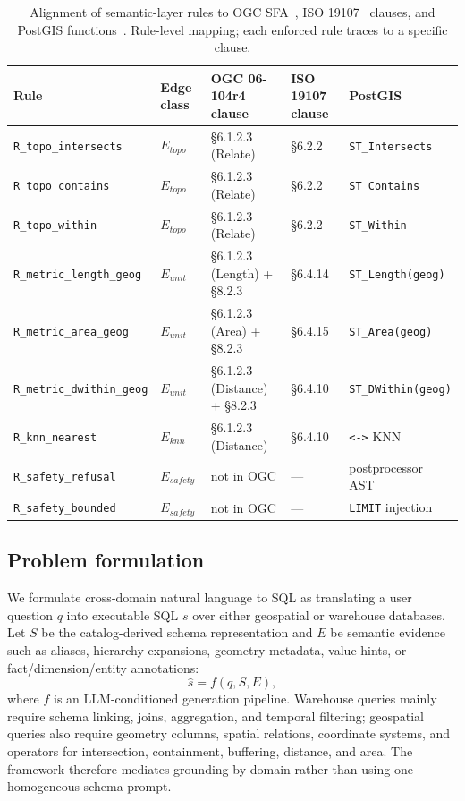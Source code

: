 \begin{table}[t]
\centering\footnotesize
\caption{Alignment of semantic-layer rules to OGC SFA~\citep{ogcsfs}, ISO 19107~\citep{iso19107} clauses, and PostGIS functions~\citep{postgis}. Rule-level mapping; each enforced rule traces to a specific clause.}
\label{tab:alignment}
{\setlength{\tabcolsep}{4pt}
\begin{tabular}{@{}lllll@{}}
\toprule
Rule & Edge class & OGC 06-104r4 clause & ISO 19107 clause & PostGIS \\
\midrule
\texttt{R\_topo\_intersects} & $E_{topo}$ & \S 6.1.2.3 (Relate)   & \S 6.2.2 & \texttt{ST\_Intersects} \\
\texttt{R\_topo\_contains}   & $E_{topo}$ & \S 6.1.2.3 (Relate)   & \S 6.2.2 & \texttt{ST\_Contains} \\
\texttt{R\_topo\_within}     & $E_{topo}$ & \S 6.1.2.3 (Relate)   & \S 6.2.2 & \texttt{ST\_Within} \\
\texttt{R\_metric\_length\_geog}   & $E_{unit}$ & \S 6.1.2.3 (Length) + \S 8.2.3 & \S 6.4.14 & \texttt{ST\_Length(geog)} \\
\texttt{R\_metric\_area\_geog}     & $E_{unit}$ & \S 6.1.2.3 (Area) + \S 8.2.3   & \S 6.4.15 & \texttt{ST\_Area(geog)} \\
\texttt{R\_metric\_dwithin\_geog}  & $E_{unit}$ & \S 6.1.2.3 (Distance) + \S 8.2.3 & \S 6.4.10 & \texttt{ST\_DWithin(geog)} \\
\texttt{R\_knn\_nearest}     & $E_{knn}$  & \S 6.1.2.3 (Distance) & \S 6.4.10 & \texttt{<->} KNN \\
\texttt{R\_safety\_refusal}  & $E_{safety}$ & not in OGC & --- & postprocessor AST \\
\texttt{R\_safety\_bounded}  & $E_{safety}$ & not in OGC & --- & \texttt{LIMIT} injection \\
\bottomrule
\end{tabular}
}
\end{table}

\subsection{Problem formulation}

We formulate cross-domain natural language to SQL as translating a user question $q$ into executable SQL $s$ over either geospatial or warehouse databases. Let $S$ be the catalog-derived schema representation and $E$ be semantic evidence such as aliases, hierarchy expansions, geometry metadata, value hints, or fact/dimension/entity annotations:
\begin{equation}
  \hat{s} = f(q, S, E),
\end{equation}
where $f$ is an LLM-conditioned generation pipeline. Warehouse queries mainly require schema linking, joins, aggregation, and temporal filtering; geospatial queries also require geometry columns, spatial relations, coordinate systems, and operators for intersection, containment, buffering, distance, and area. The framework therefore mediates grounding by domain rather than using one homogeneous schema prompt.

